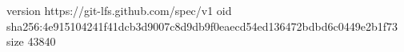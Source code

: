 version https://git-lfs.github.com/spec/v1
oid sha256:4e915104241f41dcb3d9007c8d9db9f0eaecd54ed136472bdbd6c0449e2b1f73
size 43840
